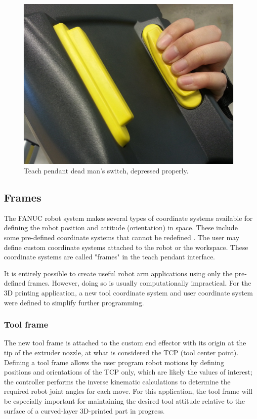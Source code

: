 \begin{figure}
    \centering
    \includegraphics[width=.8\linewidth]{figures/deadman.jpg}
    \caption{Teach pendant dead man's switch, depressed properly.}
    \label{fig:deadman}
\end{figure}

\subsection{Frames}
The FANUC robot system makes several types of coordinate systems available for defining the robot position and attitude (orientation) in space. These include some pre-defined coordinate systems  that cannot be redefined \cite[sec 3.9]{lr-handling-tool}. The user may define custom coordinate systems attached to the robot or the workspace. These coordinate systems are called "frames" in the teach pendant interface.

It is entirely possible to create useful robot arm applications using only the pre-defined frames. However, doing so is usually computationally impractical. For the 3D printing application, a new tool coordinate system and user coordinate system were defined to simplify further programming.

\subsubsection{Tool frame}
The new tool frame is attached to the custom end effector with its origin at the tip of the extruder nozzle, at what is considered the TCP (tool center point). Defining a tool frame allows the user program robot motions by defining positions and orientations of the TCP only, which are likely the values of interest; the controller performs the inverse kinematic calculations to determine the required robot joint angles for each move. For this application, the tool frame will be especially important for maintaining the desired tool attitude relative to the surface of a curved-layer 3D-printed part in progress. 

